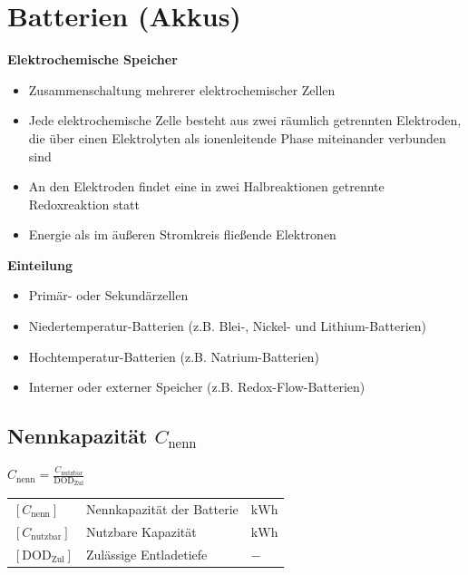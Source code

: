\section{Batterien (Akkus)}

\textbf{Elektrochemische Speicher}
\begin{itemize}
    \item Zusammenschaltung mehrerer elektrochemischer Zellen
    \item Jede elektrochemische Zelle besteht aus zwei räumlich getrennten Elektroden, 
          die über einen Elektrolyten als ionenleitende Phase miteinander verbunden sind
    \item An den Elektroden findet eine in zwei Halbreaktionen getrennte Redoxreaktion statt
    \item Energie als im äußeren Stromkreis fließende Elektronen
\end{itemize}

\textbf{Einteilung}
\begin{itemize}
    \item Primär- oder Sekundärzellen
    \item Niedertemperatur-Batterien (z.B. Blei-, Nickel- und Lithium-Batterien)
    \item Hochtemperatur-Batterien (z.B. Natrium-Batterien)
    \item Interner oder externer Speicher (z.B. Redox-Flow-Batterien)
\end{itemize}

\subsection{Nennkapazität $C_{\text{nenn}}$}

\begin{minipage}[t]{0.23\columnwidth}
$
\boxed{C_{\text{nenn}} = \frac{C_{\text{nutzbar}}}{\mathrm{DOD_{Zul}}}}
$
\end{minipage}
\hfill
\begin{minipage}[t]{0.73\columnwidth}
    \renewcommand{\arraystretch}{1.2}
        \begin{tabular}{@{} l p{4.5cm} l @{}}
            $[C_{\text{nenn}}]$     & Nennkapazität der Batterie \dotfill          & $\mathrm{kWh}$ \\
            $[C_{\text{nutzbar}}]$  & Nutzbare Kapazität \dotfill                  & $\mathrm{kWh}$ \\
            $[\mathrm{DOD_{Zul}}]$          & Zulässige Entladetiefe \dotfill   & $-$ \\
\end{tabular}
\end{minipage}



